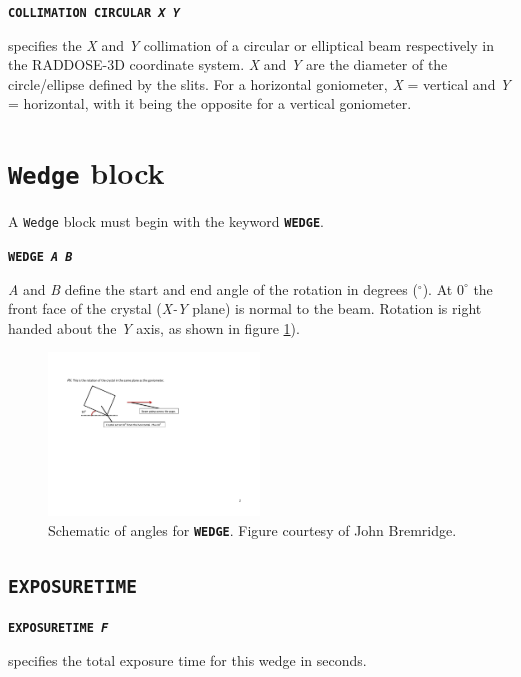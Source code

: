 \documentclass[a4paper]{article}
\newcommand{\Class}[1]{\texttt{#1}\xspace}
\newcommand{\Keyword}[1]{\texttt{\textbf{#1}}\xspace}
\begin{document}
\noindent \Keyword{COLLIMATION CIRCULAR \textit{X Y}}

specifies the \textit{X} and \textit{Y} collimation of a circular or elliptical beam respectively in the RADDOSE-3D coordinate system. 
\textit{X} and \textit{Y} are the diameter of the circle/ellipse defined by the slits. For a horizontal goniometer, \textit{X} = vertical and \textit{Y} = horizontal, with it being the opposite for a vertical goniometer. 

%

\section{\Class{Wedge} block}

A \Class{Wedge} block must begin with the keyword \Keyword{WEDGE}.

\Keyword{WEDGE \textit{A B}}

\textit{A} and \textit{B} define the start and end angle of the rotation in degrees ($^\circ$). At $0^\circ$ the front face of the crystal (\textit{X-Y} plane) is normal to the beam. Rotation is right handed about the \textit{Y} axis, as shown in figure \ref{fig:anglePhi}).
\begin{figure}[h!]
\centering
\includegraphics[width=0.5\textwidth]{Figs-for-Markus-from-JB-19-5-13-3.pdf}
\caption{Schematic of angles for \Keyword{WEDGE}. Figure courtesy of John Bremridge.}
\label{fig:anglePhi}
\end{figure}

\subsection{\Keyword{EXPOSURETIME}}

\noindent \Keyword{EXPOSURETIME \textit{F}}

specifies the total exposure time for this wedge in seconds.
\end{document}
